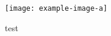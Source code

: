 \documentclass{beamer}
\begin{document}
    \begin{frame}
        \begin{figure}
            \centering
            \texttt{[image: example-image-a]}
            \caption{test}
        \end{figure}
    \end{frame}
\end{document}
